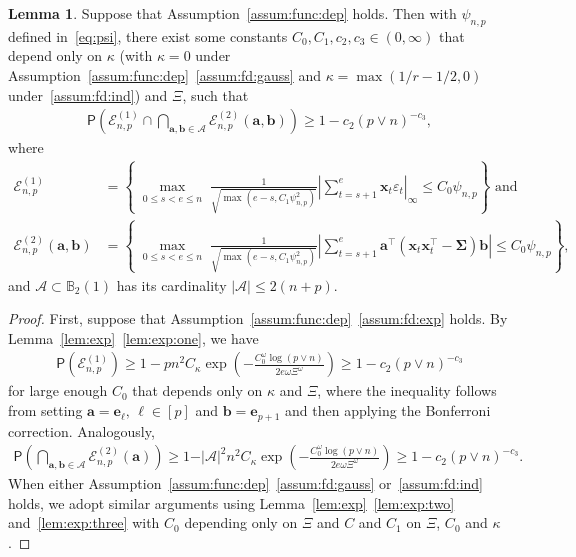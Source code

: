 \documentclass[11pt, a4paper]{article}
\newcommand{\mbf}{\mathbf}
\newcommand{\mc}{\mathcal}
\newcommand{\vep}{\varepsilon}
\renewcommand{\l}{\left}
\renewcommand{\r}{\right}
\newcommand{\p}{\mathsf{P}}
\newcommand{\nn}{\nonumber}
\theoremstyle{definition}
\theoremstyle{definition}
\theoremstyle{definition}
\newtheorem{lem}[thm]{Lemma}
\theoremstyle{definition}
\theoremstyle{definition}
\theoremstyle{remark}
\theoremstyle{definition}
\theoremstyle{definition}
\theoremstyle{definition}
\begin{document}
\begin{lem}
	\label{lem:bound}
	Suppose that Assumption~\ref{assum:func:dep}
 holds. Then with $\psi_{n, p}$ defined in~\eqref{eq:psi}, there exist some constants $C_0, C_1, c_2, c_3 \in (0, \infty)$ that depend only on $\kappa$ (with $\kappa = 0$ under Assumption~\ref{assum:func:dep}~\ref{assum:fd:gauss} and $\kappa = \max(1/r - 1/2, 0)$ under~\ref{assum:fd:ind}) and $\Xi$, such that 
	\begin{align*}
	\p\l(\mc E_{n, p}^{(1)} \cap \bigcap_{\mbf a, \mbf b \in \mc A} \mc E_{n, p}^{(2)}(\mbf a, \mbf b) \r) \ge 1 - c_2 (p \vee n)^{-c_3},
	\end{align*}
	where 
	\begin{align}
	\mc E_{n, p}^{(1)} &= \l\{ \max_{\substack{0 \le s < e \le n 
	}} \frac{1}{\sqrt{\max(e - s, C_1 \psi_{n, p}^2)}} \l\vert \sum_{t = s + 1}^e \mbf x_t \vep_t \r\vert_\infty \le C_0\psi_{n, p} \r\} \text{ \ and}
	\nn
	\\
	\mc E_{n, p}^{(2)}(\mbf a, \mbf b) &= \l\{ \max_{\substack{0 \le s < e \le n 	}} \frac{1}{\sqrt{\max(e - s, C_1 \psi_{n, p}^2)}} \l\vert \sum_{t = s + 1}^e \mbf a^\top \l(\mbf x_t \mbf x_t^\top - \bm\Sigma\r) \mbf b \r\vert \le C_0 \psi_{n, p} \r\},
	\nn
	\end{align}
	and $\mc A \subset \mathbb{B}_2(1)$ has its cardinality $\vert \mc A \vert \le 2(n + p)$.
\end{lem}

\begin{proof} First, suppose that Assumption~\ref{assum:func:dep}~\ref{assum:fd:exp} holds.
	By Lemma~\ref{lem:exp}~\ref{lem:exp:one}, we have
	\begin{align*}
	\p\l( \mc E_{n, p}^{(1)} \r)
	\ge 1 - p n^2 C_\kappa \exp\l(- \frac{C_0^\omega \log(p \vee n)}{2 e \omega \Xi^\omega} \r)  \ge 1 - c_2 (p \vee n)^{-c_3}
	\end{align*}
	for large enough $C_0$ that depends only on $\kappa$ and $\Xi$, where the inequality follows from setting $\mbf a = \mbf e_\ell, \, \ell \in [p]$ and $\mbf b = \mbf e_{p + 1}$ and then applying the Bonferroni correction.
	Analogously, 
	\begin{align*}
	\p\l( \bigcap_{\mbf a, \mbf b \in \mc A} \mc E_{n, p}^{(2)}(\mbf a) \r) \ge 1 - \vert \mc A \vert^2 n^2 C_\kappa \exp\l(- \frac{C_0^\omega \log(p \vee n)}{2 e \omega \Xi^\omega} \r) \ge 1 - c_2 (p \vee n)^{-c_3}.
	\end{align*}
	When either Assumption~\ref{assum:func:dep}~\ref{assum:fd:gauss} or~\ref{assum:fd:ind} holds, we adopt similar arguments using Lemma~\ref{lem:exp}~\ref{lem:exp:two} and~\ref{lem:exp:three} with $C_0$ depending only on $\Xi$ and $C$ and $C_1$ on $\Xi$, $C_0$ and $\kappa$.
\end{proof}
\end{document}
